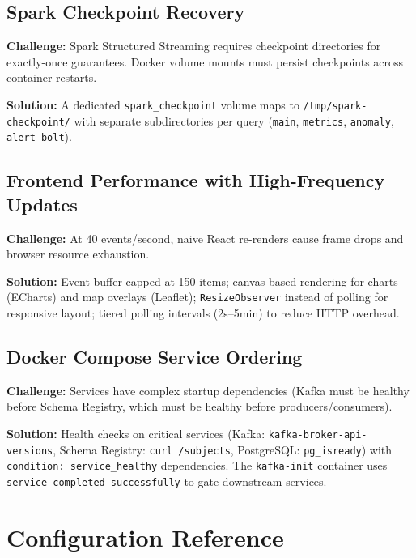 \documentclass[12pt,a4paper]{article}
\begin{document}
\subsection{Spark Checkpoint Recovery}

\textbf{Challenge:} Spark Structured Streaming requires checkpoint directories for exactly-once guarantees. Docker volume mounts must persist checkpoints across container restarts.

\textbf{Solution:} A dedicated \texttt{spark\_checkpoint} volume maps to \texttt{/tmp/spark-checkpoint/} with separate subdirectories per query (\texttt{main}, \texttt{metrics}, \texttt{anomaly}, \texttt{alert-bolt}).

\subsection{Frontend Performance with High-Frequency Updates}

\textbf{Challenge:} At 40 events/second, naive React re-renders cause frame drops and browser resource exhaustion.

\textbf{Solution:} Event buffer capped at 150 items; canvas-based rendering for charts (ECharts) and map overlays (Leaflet); \texttt{ResizeObserver} instead of polling for responsive layout; tiered polling intervals (2s--5min) to reduce HTTP overhead.

\subsection{Docker Compose Service Ordering}

\textbf{Challenge:} Services have complex startup dependencies (Kafka must be healthy before Schema Registry, which must be healthy before producers/consumers).

\textbf{Solution:} Health checks on critical services (Kafka: \texttt{kafka-broker-api-versions}, Schema Registry: \texttt{curl /subjects}, PostgreSQL: \texttt{pg\_isready}) with \texttt{condition: service\_healthy} dependencies. The \texttt{kafka-init} container uses \texttt{service\_completed\_successfully} to gate downstream services.

\section{Configuration Reference}
\end{document}
